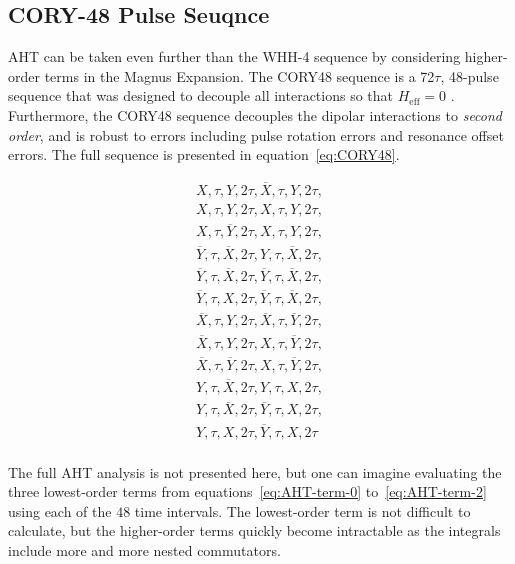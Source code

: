 \subsection{CORY-48 Pulse Seuqnce}\label{subsec:CORY48}

AHT can be taken even further than the WHH-4 sequence by considering higher-order terms in the Magnus Expansion. The CORY48 sequence is a 72$\tau$, 48-pulse sequence that was designed to decouple all interactions so that $H_{\text{eff}} = 0$ \cite{CORY1990205}. Furthermore, the CORY48 sequence decouples the dipolar interactions to \emph{second order}, and is robust to errors including pulse rotation errors and resonance offset errors. The full sequence is presented in equation~\ref{eq:CORY48}.

\begin{equation}\label{eq:CORY48}
\begin{aligned}
    X, \tau, Y, 2\tau, \overline{X}, \tau, Y, 2\tau, \\
    X, \tau, Y, 2\tau, X, \tau, Y, 2\tau, \\
    X, \tau, \overline{Y}, 2\tau, X, \tau, Y, 2\tau, \\
    \overline{Y}, \tau, \overline{X}, 2\tau, Y, \tau, \overline{X}, 2\tau, \\
    \overline{Y}, \tau, \overline{X}, 2\tau, \overline{Y}, \tau, \overline{X}, 2\tau, \\
    \overline{Y}, \tau, X, 2\tau, \overline{Y}, \tau, \overline{X}, 2\tau, \\
    \overline{X}, \tau, Y, 2\tau, \overline{X}, \tau, \overline{Y}, 2\tau, \\
    \overline{X}, \tau, Y, 2\tau, X, \tau, \overline{Y}, 2\tau, \\
    \overline{X}, \tau, \overline{Y}, 2\tau, X, \tau, \overline{Y}, 2\tau, \\
    Y, \tau, \overline{X}, 2\tau, Y, \tau, X, 2\tau, \\
    Y, \tau, \overline{X}, 2\tau, \overline{Y}, \tau, X, 2\tau, \\
    Y, \tau, X, 2\tau, \overline{Y}, \tau, X, 2\tau \\
\end{aligned}
\end{equation}


The full AHT analysis is not presented here, but one can imagine evaluating the three lowest-order terms from equations~\ref{eq:AHT-term-0} to~\ref{eq:AHT-term-2} using each of the $48$ time intervals. The lowest-order term is not difficult to calculate, but the higher-order terms quickly become intractable as the integrals include more and more nested commutators.

